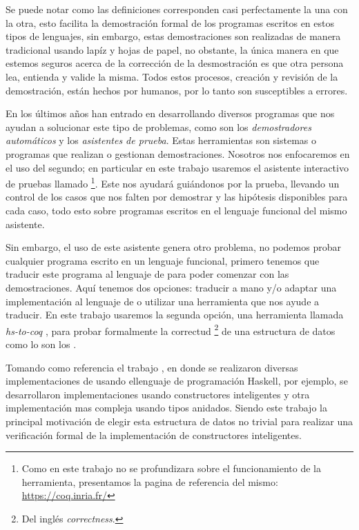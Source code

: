 Se puede notar como las definiciones corresponden casi perfectamente la una con la otra,
esto facilita la demostraci\'on formal de los programas escritos en estos tipos de lenguajes, sin
embargo, estas demostraciones son realizadas de manera tradicional usando lap\'iz y hojas de papel,
no obstante, la \'unica manera en que estemos seguros acerca de la correcci\'on de la desmostraci\'on es
que otra persona lea, entienda y valide la misma. Todos estos procesos, creaci\'on y revisi\'on de la
demostraci\'on, están hechos por humanos, por lo tanto son susceptibles a errores.

En los últimos años han entrado en desarrollando diversos programas que nos ayudan a solucionar este
tipo de problemas, como son los \textit{demostradores autom\'aticos} y los \textit{asistentes de
prueba}. Estas herramientas son sistemas o programas que realizan o gestionan demostraciones. 
Nosotros nos enfocaremos en el uso del segundo; en particular en este trabajo usaremos el asistente 
interactivo de pruebas llamado {\coq}\footnote{Como en este trabajo no se profundizara sobre el 
funcionamiento de la herramienta, presentamos la pagina de referencia del mismo: 
\url{https://coq.inria.fr/}}. Este nos ayudar\'a gui\'andonos por la prueba, llevando un control de 
los casos que nos falten por demostrar y las hip\'otesis disponibles para cada caso, todo esto sobre 
programas escritos en el lenguaje funcional del mismo asistente.

Sin embargo, el uso de este asistente genera otro problema, no podemos probar cualquier programa
escrito en un lenguaje funcional, primero tenemos que traducir este programa al lenguaje de {\coq}
para poder comenzar con las demostraciones. Aquí tenemos dos opciones: traducir a mano y/o adaptar 
una implementación al lenguaje de {\coq} o utilizar una herramienta que nos ayude a traducir. En 
este trabajo usaremos la segunda opci\'on, una herramienta llamada \textit{hs-to-coq} \cite{thrc}, 
para probar formalmente la correctud \footnote{Del ingl\'es \textit{correctness}.} de una estructura 
de datos como lo son los {\arns}.

Tomando como referencia el trabajo \cite{tesisG}, en donde se realizaron diversas implementaciones 
de {\arns} usando ellenguaje de programaci\'on Haskell, por ejemplo, se desarrollaron 
implementaciones usando constructores inteligentes y otra implementaci\'on mas compleja usando tipos 
anidados. Siendo este trabajo la principal motivaci\'on de elegir esta estructura de datos no 
trivial para realizar una verificaci\'on formal de la implementaci\'on de constructores 
inteligentes.

